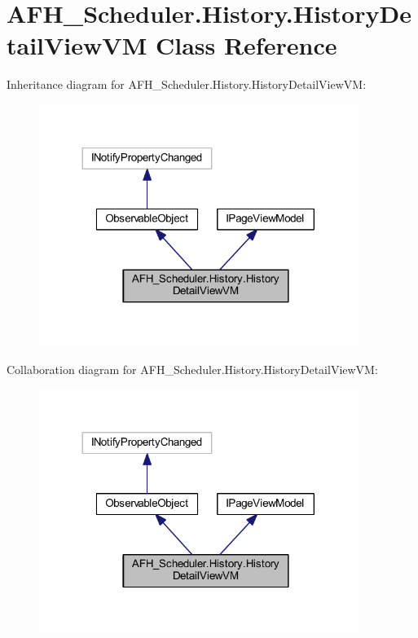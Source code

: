 \section{A\+F\+H\+\_\+\+Scheduler.\+History.\+History\+Detail\+View\+VM Class Reference}
\label{class_a_f_h___scheduler_1_1_history_1_1_history_detail_view_v_m}


Inheritance diagram for A\+F\+H\+\_\+\+Scheduler.\+History.\+History\+Detail\+View\+VM\+:
\nopagebreak
\begin{figure}[H]
\begin{center}
\leavevmode
\includegraphics[width=293pt]{class_a_f_h___scheduler_1_1_history_1_1_history_detail_view_v_m__inherit__graph}
\end{center}
\end{figure}


Collaboration diagram for A\+F\+H\+\_\+\+Scheduler.\+History.\+History\+Detail\+View\+VM\+:
\nopagebreak
\begin{figure}[H]
\begin{center}
\leavevmode
\includegraphics[width=293pt]{class_a_f_h___scheduler_1_1_history_1_1_history_detail_view_v_m__coll__graph}
\end{center}
\end{figure}
